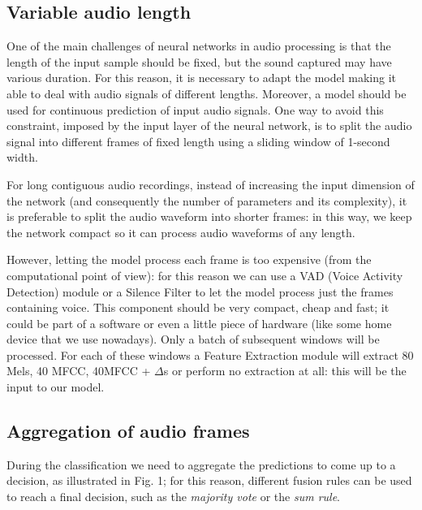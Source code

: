 \documentclass[conference]{IEEEtran}
\begin{document}
\subsection{Variable audio length}
One of the main challenges of neural networks in audio processing is that the length of the input sample should be fixed, but the sound captured may have various duration. For this reason, it is necessary to adapt the model making it able to deal with audio signals of different lengths. Moreover, a model should be used for continuous prediction of input audio signals. One way to avoid this constraint, imposed by the input layer of the neural network, is to split the audio signal into different frames of fixed length using a sliding window of 1-second width.

For long contiguous audio recordings, instead of increasing the input dimension of the network (and consequently the number of parameters and its complexity), it is preferable to split the audio waveform into shorter frames: in this way, we keep the network compact so it can process audio waveforms of any length.

However, letting the model process each frame is too expensive (from the computational point of view): for this reason we can use a VAD (Voice Activity Detection) module or a Silence Filter to let the model process just the frames containing voice. This component should be very compact, cheap and fast; it could be part of a software or even a little piece of hardware (like some home device that we use nowadays).
Only a batch of subsequent windows will be processed. For each of these windows a Feature Extraction module will extract 80 Mels, 40 MFCC, 40MFCC + $\Delta$s or perform no extraction at all: this will be the input to our model.

\subsection{Aggregation of audio frames}
During the classification we need to aggregate the predictions to come up to a decision, as illustrated in Fig. 1; for this reason, different fusion rules can be used to reach a final decision, such as the \textit{majority vote} or the \textit{sum rule}.
\end{document}
